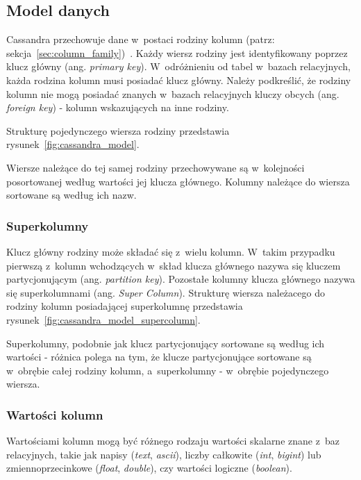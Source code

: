 


\subsection{Model danych}

Cassandra przechowuje dane w~postaci rodziny kolumn (patrz: sekcja~\ref{sec:column_family})~\cite{cassandra_model}.
Każdy wiersz rodziny jest identyfikowany poprzez klucz główny (ang. \emph{primary key}).
W~odróżnieniu od tabel w~bazach relacyjnych, każda rodzina kolumn musi posiadać klucz główny.
Należy podkreślić, że rodziny kolumn nie mogą posiadać znanych w~bazach relacyjnych kluczy obcych (ang. \emph{foreign key}) - kolumn wskazujących na inne rodziny.

Strukturę pojedynczego wiersza rodziny przedstawia rysunek~\ref{fig:cassandra_model}.



Wiersze należące do tej samej rodziny przechowywane są w~kolejności posortowanej według wartości jej klucza głównego.
Kolumny należące do wiersza sortowane są według ich nazw.

\subsubsection{Superkolumny}

Klucz główny rodziny może składać się z~wielu kolumn.
W~takim przypadku pierwszą z~kolumn wchodzących w~skład klucza głównego nazywa się kluczem partycjonującym (ang. \emph{partition key}).
Pozostałe kolumny klucza głównego nazywa się superkolumnami (ang. \emph{Super Column}).
Strukturę wiersza należacego do rodziny kolumn posiadającej superkolumnę przedstawia rysunek~\ref{fig:cassandra_model_supercolumn}.



Superkolumny, podobnie jak klucz partycjonujący sortowane są według ich wartości - różnica polega na tym, że klucze partycjonujące sortowane są w~obrębie całej rodziny kolumn, a~superkolumny - w~obrębie pojedynczego wiersza.

\subsubsection{Wartości kolumn}

Wartościami kolumn mogą być różnego rodzaju wartości skalarne znane z~baz relacyjnych, takie jak napisy (\emph{text}, \emph{ascii}), liczby całkowite (\emph{int}, \emph{bigint}) lub zmiennoprzecinkowe (\emph{float}, \emph{double}), czy wartości logiczne (\emph{boolean}).

